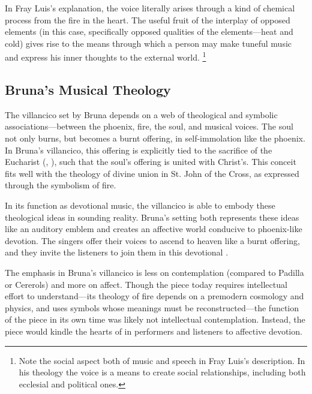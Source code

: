 In Fray Luis's explanation, the voice literally arises through a kind of chemical process from the fire in the heart.
The useful fruit of the interplay of opposed elements (in this case, specifically opposed qualities of the elements---heat and cold) gives rise to the means through which a person may make tuneful music and express his inner thoughts to the external world.%
	\footnote{%
	Note the social aspect both of music and speech in Fray Luis's description.
	In his theology the voice is a means to create social relationships, including both ecclesial and political ones.
	}

\subsection{%
Bruna's Musical Theology
}

The villancico set by Bruna depends on a web of theological and symbolic associations---between the phoenix, fire, the soul, and musical voices.
The soul not only burns, but becomes a burnt offering, in self-immolation like the phoenix.
In Bruna's villancico, this offering is explicitly tied to the sacrifice of the Eucharist (, ), such that the soul's offering is united with Christ's.
This conceit fits well with the theology of divine union in St. John of the Cross, as expressed through the symbolism of fire.

In its function as devotional music, the villancico is able to embody these theological ideas in sounding reality.
Bruna's setting both represents these ideas like an auditory emblem and creates an affective world conducive to phoenix-like devotion.
The singers offer their voices to ascend to heaven like a burnt offering, and they invite the listeners to join them in this devotional .

The emphasis in Bruna's villancico is less on contemplation (compared to Padilla or Cererols) and more on affect.
Though the piece today requires intellectual effort to understand---its theology of fire depends on a premodern cosmology and physics, and uses symbols whose meanings must be reconstructed---the function of the piece in its own time was likely not intellectual contemplation.
Instead, the piece would kindle the hearts of in performers and listeners to affective devotion.


